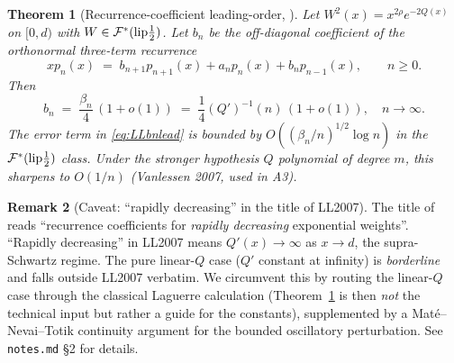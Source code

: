 \documentclass[11pt]{article}
\newtheorem{theorem}{Theorem}
\theoremstyle{definition}
\newtheorem{remark}[theorem]{Remark}
\begin{document}
\begin{theorem}[Recurrence-coefficient leading-order, {\cite[Thm.~1.1]{LL2007}}]
\label{thm:LLrecur}
Let $W^2(x)=x^{2\rho}e^{-2Q(x)}$ on $[0,d)$ with
$W\in\mathcal{F}^*(\textnormal{lip}\frac{1}{2})$.  Let $b_n$ be the
off-diagonal coefficient of the orthonormal three-term recurrence
\begin{equation}\label{eq:OPrecur}
   x p_n(x)\;=\;b_{n+1}p_{n+1}(x)+a_n p_n(x)+b_n p_{n-1}(x),\qquad n\ge 0.
\end{equation}
Then
\begin{equation}\label{eq:LLbnlead}
   b_n \;=\; \frac{\beta_n}{4}\,(1+o(1)) \;=\; \frac{1}{4}(Q')^{-1}(n)\,(1+o(1)),
   \quad n\to\infty.
\end{equation}
The error term in \eqref{eq:LLbnlead} is bounded by
$O((\beta_n/n)^{1/2}\log n)$ in the
$\mathcal{F}^*(\textnormal{lip}\frac{1}{2})$ class.  Under the stronger
hypothesis $Q$ polynomial of degree $m$, this sharpens to $O(1/n)$
(Vanlessen 2007, used in A3).
\end{theorem}

\begin{remark}[Caveat: ``rapidly decreasing'' in the title of LL2007]
\label{rem:LL2007caveat}
The title of \cite{LL2007} reads ``recurrence coefficients for
\emph{rapidly decreasing} exponential weights''.  ``Rapidly decreasing''
in LL2007 means $Q'(x)\to\infty$ as $x\to d$, the supra-Schwartz
regime.  The pure linear-$Q$ case ($Q'$ constant at infinity) is
\emph{borderline} and falls outside LL2007 verbatim.  We circumvent
this by routing the linear-$Q$ case through the classical Laguerre
calculation (Theorem~\ref{thm:LLrecur} is then \emph{not} the technical
input but rather a guide for the constants), supplemented by a
Mat\'e--Nevai--Totik continuity argument
\cite{MNT1985} for the bounded oscillatory perturbation.  See
\texttt{notes.md} \S 2 for details.
\end{remark}
\end{document}
